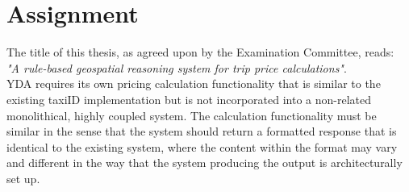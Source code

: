 %
\section{Assignment}
The title of this thesis, as agreed upon by the Examination Committee, reads: \\
\textit{"A rule-based geospatial reasoning system for trip price calculations"}. \\

YDA requires its own pricing calculation functionality that is similar to the existing taxiID implementation but is not incorporated into a non-related monolithical, highly coupled system. The calculation functionality must be similar in the sense that the system should return a formatted response that is identical to the existing system, where the content within the format may vary and different in the way that the system producing the output is architecturally set up.





